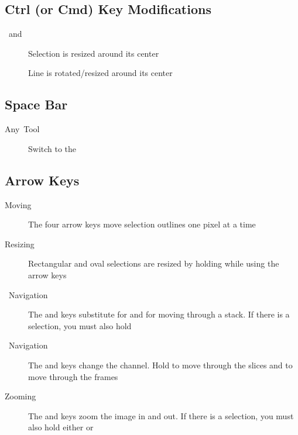 

\subsection{Ctrl (or Cmd) Key Modifications}
\begin{description}
\item [{\ and\ }] Selection
is resized around its center 
\item [{}] Line is rotated/resized
around its center
\end{description}



\subsection{Space Bar}
\begin{description}
\item [{Any\ Tool}] Switch to the 
\end{description}

\subsection{Arrow Keys\label{Arrow-Keys}}
\begin{description}
\item [{Moving\ }] The four arrow keys
move selection outlines one pixel at a time
\item [{Resizing\ }] Rectangular and oval
selections are resized by holding  while using the
arrow keys
\item [{\ Navigation}] The \mykeystroke{$\leftarrow$}
and \mykeystroke{$\rightarrow$} keys substitute for \mykeystroke{<}
and \mykeystroke{>} for moving through a stack. If there is a selection,
you must also hold 
\item [{\ Navigation}] The \mykeystroke{$\leftarrow$}
and \mykeystroke{$\rightarrow$} keys change the channel. Hold 
to move through the slices and  to move through
the frames
\item [{Zooming}] The \mykeystroke{$\uparrow$} and \mykeystroke{$\downarrow$}
keys zoom the image in and out. If there is a selection, you must
also hold either  or 
\end{description}

